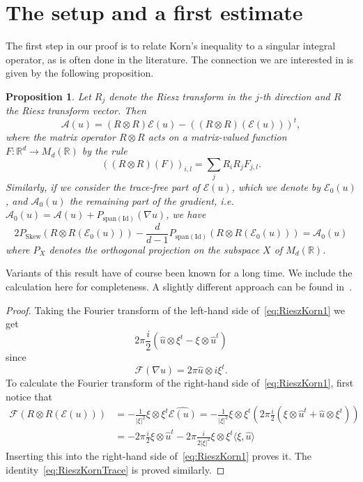 \documentclass[11pt, a4paper]{amsart}
\newtheorem{proposition}{Proposition}[section]
\theoremstyle{definition}
\theoremstyle{remark}
\newcommand{\R}{\mathbb{R}}
\begin{document}
\section{The setup and a first estimate}
The first step in our proof
is to relate Korn's inequality to 
a singular integral operator, as is often
done in the literature. The connection
we are interested in is given
by the following proposition.
\begin{proposition}
Let $R_j$ denote the Riesz transform in
the $j$-th direction and $R$ the Riesz transform vector.
Then
\begin{equation}\label{eq:RieszKorn1}
\mathcal A(u)=(R\otimes R)\mathcal E(u)
-((R\otimes R)(\mathcal E(u)))^t, 
\end{equation}
where the matrix operator $R\otimes R$ acts
on a matrix-valued function
$F\colon\mathbb{R}^d\to M_d(\mathbb{R})$ by the rule
\begin{equation}\label{eq:RieszKorndef}
((R\otimes R)(F))_{i,l}=\sum_j R_iR_jF_{j,l}.
\end{equation}
Similarly, if we consider the trace-free part of 
$\mathcal E(u)$, which we denote by $\mathcal E_0(u)$,
and $\mathcal A_0(u)$ the remaining part
of the gradient, i.e.
$\mathcal A_0(u)=\mathcal A(u)
+P_{\mathrm{span}(\mathrm{Id})}(\nabla u)$,
we have
\begin{equation}\label{eq:RieszKornTrace}
    2P_{\mathrm{Skew}} (R\otimes R (\mathcal E_0(u)))-
    \frac{d}{d-1}P_{\mathrm{span}(\mathrm{Id})}
    (R\otimes R(\mathcal E_0(u)))=\mathcal A_0(u)
\end{equation}
where $P_X$ denotes the orthogonal projection
on the subspace $X$ of $M_d(\R)$.
\end{proposition}
Variants of this result have of course been known
for a long time.
We include the calculation here for completeness.
A slightly different approach can be found
in~\cite{spector}.
\begin{proof}
Taking the Fourier transform of the left-hand side
of~\eqref{eq:RieszKorn1} we get
\begin{equation*}
    2\pi\frac i2
    \left(
        \widehat u\otimes \xi^t-\xi\otimes \widehat u^t
    \right)
\end{equation*}
since
\begin{equation*}
    \mathcal F(\nabla u)=2\pi \widehat u\otimes i\xi^t.
\end{equation*}
To calculate the Fourier transform
of the right-hand side
of~\eqref{eq:RieszKorn1}, first notice that
\begin{align*}
\mathcal F(R\otimes R (\mathcal E(u)))
&=
-\frac1{|\xi|^2}\xi\otimes \xi^t
\widehat{\mathcal E(u)}
=
-\frac1{|\xi|^2}\xi\otimes \xi^t
\left(
2\pi \frac i2
\left(
\xi\otimes \widehat u^t 
+\widehat u\otimes \xi^t
\right)
\right)
\\&=
-2\pi \frac i2\xi\otimes \widehat u^t-
2\pi \frac{i}{2{|\xi|^2}}
\xi\otimes \xi^t\langle \xi, \widehat u\rangle
\end{align*}
Inserting this into the right-hand side
of~\eqref{eq:RieszKorn1} proves
it. The identity~\eqref{eq:RieszKornTrace} is proved similarly.
\end{proof}
\end{document}
